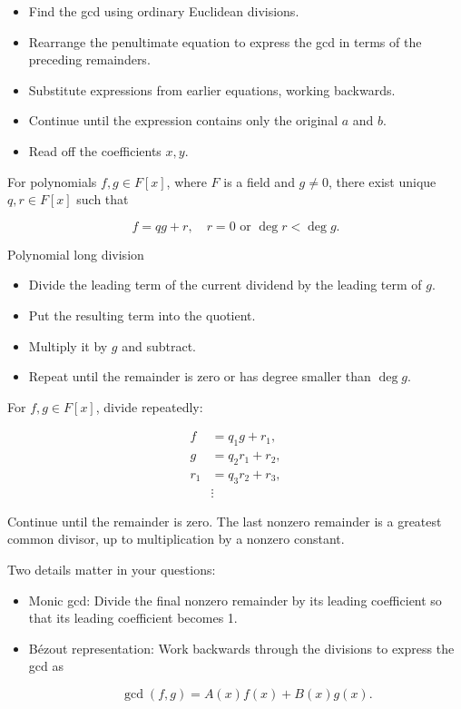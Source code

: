 \begin{method}
 
  \begin{itemize}\emph{}
  \item[1.] Find the gcd using ordinary Euclidean divisions.
\item[2.] Rearrange the penultimate equation to express the gcd in terms of the preceding remainders.
\item[3.] Substitute expressions from earlier equations, working backwards.
\item[4.] Continue until the expression contains only the original \(a\) and \(b\).
\item[5.] Read off the coefficients \(x, y\).
\end{itemize} 
\end{method}

\begin{method}
  For polynomials \(f, g \in F[x]\), where \(F\) is a field and \(g \neq 0\), there exist unique \(q, r \in F[x]\) such that

\[
f=q g+r, \quad r=0 \text { or } \operatorname{deg} r<\operatorname{deg} g .
\]


Polynomial long division
\begin{itemize}
\item[1.] Divide the leading term of the current dividend by the leading term of \(g\).
\item[2.] Put the resulting term into the quotient.
\item[3.] Multiply it by \(g\) and subtract.
\item[4.] Repeat until the remainder is zero or has degree smaller than \(\operatorname{deg} g\).
\end{itemize}
\end{method}

\begin{method}
  For \(f, g \in F[x]\), divide repeatedly:

\[
\begin{aligned}
f & =q_1 g+r_1, \\
g & =q_2 r_1+r_2, \\
r_1 & =q_3 r_2+r_3, \\
& \vdots
\end{aligned}
\]

Continue until the remainder is zero. The last nonzero remainder is a greatest common divisor, up to multiplication by a nonzero constant.

Two details matter in your questions:
\begin{itemize}
\item[-] Monic gcd: Divide the final nonzero remainder by its leading coefficient so that its leading coefficient becomes 1.
\item[-] Bézout representation: Work backwards through the divisions to express the gcd as

\[
\gcd(f,g)=A(x)f(x)+B(x)g(x).
\]

\end{itemize}
\end{method}


